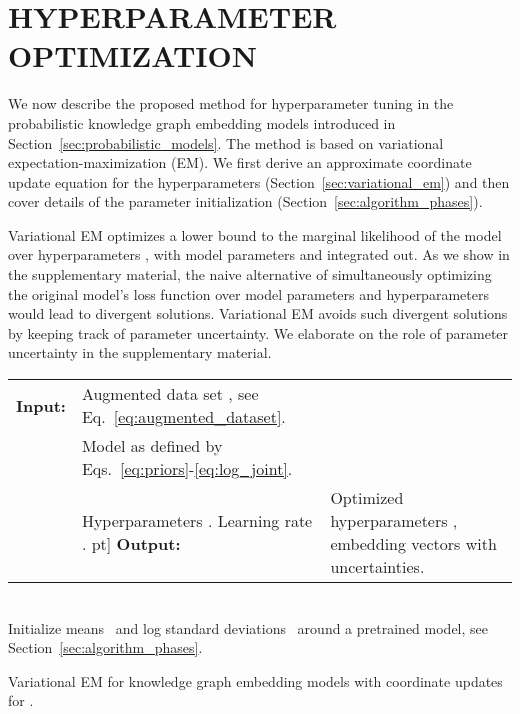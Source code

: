 \documentclass[letterpage]{article}
\begin{document}
 \section{HYPERPARAMETER OPTIMIZATION}
\label{sec:method}

We now describe the proposed method for hyperparameter tuning in the probabilistic knowledge graph embedding models introduced in Section~\ref{sec:probabilistic_models}.
The method is based on variational expectation-maximization (EM).
We first derive an approximate coordinate update equation for the hyperparameters (Section~\ref{sec:variational_em}) and then cover details of the parameter initialization (Section~\ref{sec:algorithm_phases}).

Variational EM optimizes a lower bound to the marginal likelihood of the model over hyperparameters , with model parameters  and  integrated out.
As we show in the supplementary material, the naive alternative of simultaneously optimizing the original model's loss function
over model parameters and hyperparameters would lead to divergent solutions.
Variational EM avoids such divergent solutions by keeping track of parameter uncertainty.
We elaborate on the role of parameter uncertainty in the supplementary material.


\begin{algorithm2e}[t!]
  \setlength{\hsize}{\dimexpr(\columnwidth-0.8em)}
  \DontPrintSemicolon
  \begin{tabularx}{\hsize}{@{}l@{}>{\raggedright\arraybackslash}X@{}}
    \textbf{Input:}
      & Augmented data set , see Eq.~\ref{eq:augmented_dataset}. \\
      & Model  as defined by Eqs.~\ref{eq:priors}-\ref{eq:log_joint}.\\
      & Hyperparameters .
        Learning rate . \2pt]
    \textbf{Output:} & Optimized hyperparameters , embedding vectors  with uncertainties.
  \end{tabularx}\\\vspace{2pt}
  \nl Initialize means~ and log standard deviations~ around a pretrained model, see Section~\ref{sec:algorithm_phases}.\;\vspace{2pt}
  \nl {}
  \caption{Variational EM for knowledge graph embedding models with coordinate updates for .}
  \label{alg:variational_em}
\end{algorithm2e}
\end{document}
